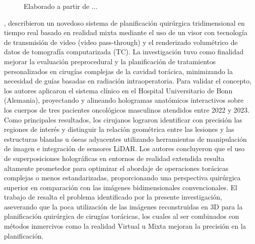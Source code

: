 \begin{sectext}
\begin{figure}[H]
            \vspace{0.1cm}
            \small Elaborado a partir de ...
        \end{figure}

        \textcite{arensmeyer_system_2024}, describieron un novedoso sistema de planificación quirúrgica tridimensional en tiempo real basado en realidad mixta mediante el uso de un visor con tecnología de transmisión de video (video pass-through) y el renderizado volumétrico de datos de tomografía computarizada (TC). La investigación tuvo como finalidad mejorar la evaluación preprocedural y la planificación de tratamientos personalizados en cirugías complejas de la cavidad torácica, minimizando la necesidad de guías basadas en radiación intraoperatoria. Para validar el concepto, los autores aplicaron el sistema clínico en el Hospital Universitario de Bonn (Alemania), proyectando y alineando hologramas anatómicos interactivos sobre los cuerpos de tres pacientes oncológicos masculinos atendidos entre 2022 y 2023. Como principales resultados, los cirujanos lograron identificar con precisión las regiones de interés y distinguir la relación geométrica entre las lesiones y las estructuras blandas u óseas adyacentes utilizando herramientas de manipulación de imagen e integración de sensores LiDAR. Los autores concluyeron que el uso de superposiciones holográficas en entornos de realidad extendida resulta altamente prometedor para optimizar el abordaje de operaciones torácicas complejas o menos estandarizadas, proporcionando una perspectiva quirúrgica superior en comparación con las imágenes bidimensionales convencionales. El trabajo de \textcite{arensmeyer_system_2024} resalta el problema identificado por la presente investigación, aseverando que la poca utilización de las imágenes reconstruidas en 3D para la planificación quirúrgica de cirugías torácicas, los cuales al ser combinados con métodos inmercivos como la realidad Virtual u Mixta mejoran la precisión en la planificación. \newline
        

\end{sectext}
